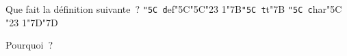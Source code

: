 \def\\#1{{\tt \char"5C #1}}


Que fait la définition suivante\ ?
\\def\char"5C\char"5C\char"23 1\char"7B\\tt\char"7B \\char"5C \char"23 1\char"7D\char"7D

Pourquoi\ ?


\bye

